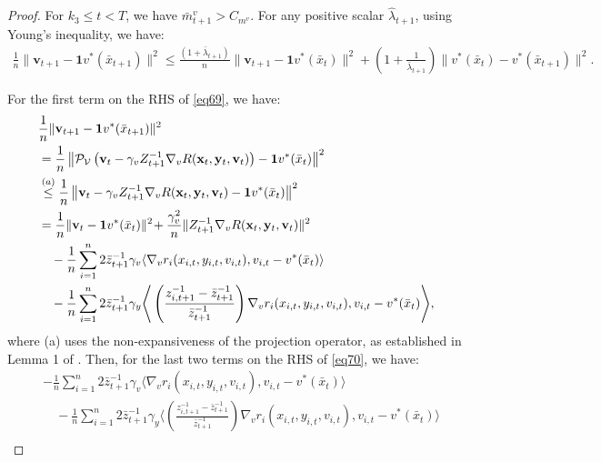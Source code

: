 \documentclass{article}
\theoremstyle{plain}
\theoremstyle{definition}
\theoremstyle{remark}
\begin{document}
\begin{proof}
For \(k_3 \leq t < T\), we have \(\bar{m}^v_{t+1} > C_{m^v}\). For any positive scalar \(\hat{\lambda}_{t+1}\), using Young's inequality, we have:
\begin{align}
\frac{1}{n}\|\mathbf{v}_{t+1} - \mathbf{1}v^*(\bar{x}_{t+1})\|^2 
\leq \frac{(1 + \bar{\lambda}_{t+1})}{n} \|\mathbf{v}_{t+1} - \mathbf{1}v^*(\bar{x}_t)\|^2 
+ \left( 1 + \frac{1}{\bar{\lambda}_{t+1}} \right) \|v^*(\bar{x}_t) - v^*(\bar{x}_{t+1})\|^2. \label{eq69}
\end{align}

For the first term on the RHS of \cref{eq69}, we have:
\begin{align}
&\frac{1}{n}\|\mathbf{v}_{t+1} - \mathbf{1}v^*(\bar{x}_{t+1})\|^2 \nonumber\\
&= \frac{1}{n}\left\| \mathcal{P}_{\mathcal{V}}\left(\mathbf{v}_{t}- \gamma_v Z^{-1}_{t+1} \nabla_v R(\mathbf{x}_t, \mathbf{y}_t, \mathbf{v}_t) \right)- \mathbf{1}v^*(\bar{x}_{t}) \right\|^2 \nonumber \\
&\overset{(a)}{\leq} \frac{1}{n}\left\| \mathbf{v}_{t}- \gamma_v Z^{-1}_{t+1} \nabla_v R(\mathbf{x}_t, \mathbf{y}_t, \mathbf{v}_t) - \mathbf{1}v^*(\bar{x}_{t}) \right\|^2 \nonumber \\
&= \frac{1}{n}\|\mathbf{v}_{t} -\mathbf{1}v^*(\bar{x}_{t})\|^2\! 
+ \frac{\gamma_v^2}{n} \|Z^{-1}_{t+1}\nabla_v R(\mathbf{x}_t, \mathbf{y}_t, \mathbf{v}_t)\|^2 
\notag\\
&\quad- \frac{1}{n}\sum_{i=1}^n 2\bar{z}^{-1}_{t+1}\gamma_v \langle \nabla_v r_i(x_{i,t}, y_{i,t}, v_{i,t}) , v_{i,t} - v^*(\bar{x}_t)\rangle\nonumber\\
&\quad-\frac{1}{n}\sum_{i=1}^n 2\bar{z}_{t+1}^{-1} \gamma_y\Bigg\langle \left(\frac{z_{i,t+1}^{-1}-\bar{z}_{t+1}^{-1}}{\bar{z}_{t+1}^{-1}}\right) \nabla_v r_i(x_{i,t}, y_{i,t}, v_{i,t}) , v_{i,t} - v^*(\bar{x}_t)\Bigg\rangle,\label{eq70}
\end{align}
where (a) uses the non-expansiveness of the projection operator, as established in Lemma 1 of \citep{nedic2010constrained}. Then, for the last two terms on the RHS of \cref{eq70}, we have:
\begin{align}
&- \frac{1}{n}\sum_{i=1}^n 2\bar{z}^{-1}_{t+1}\gamma_v \langle \nabla_v r_i(x_{i,t}, y_{i,t}, v_{i,t}) , v_{i,t} - v^*(\bar{x}_t)\rangle\nonumber\\
&\quad-\frac{1}{n}\sum_{i=1}^n 2\bar{z}_{t+1}^{-1} \gamma_y\Bigg\langle\!\!\! \left(\!\!\frac{z_{i,t+1}^{-1}\!\!-\!\!\bar{z}_{t+1}^{-1}}{\bar{z}_{t+1}^{-1}}\right) \nabla_v r_i(x_{i,t}, y_{i,t}, v_{i,t}) , v_{i,t} \!\!-\!\! v^*(\bar{x}_t)\!\!\!\Bigg\rangle\nonumber\\ 

\end{align}
\end{proof}
\end{document}

